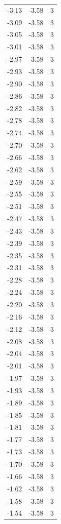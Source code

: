 \begin{longtable}{lrr}
  -3.13 & -3.58 & 3 \\
  -3.09 & -3.58 & 3 \\
  -3.05 & -3.58 & 3 \\
  -3.01 & -3.58 & 3 \\
  -2.97 & -3.58 & 3 \\
  -2.93 & -3.58 & 3 \\
  -2.90 & -3.58 & 3 \\
  -2.86 & -3.58 & 3 \\
  -2.82 & -3.58 & 3 \\
  -2.78 & -3.58 & 3 \\
  -2.74 & -3.58 & 3 \\
  -2.70 & -3.58 & 3 \\
  -2.66 & -3.58 & 3 \\
  -2.62 & -3.58 & 3 \\
  -2.59 & -3.58 & 3 \\
  -2.55 & -3.58 & 3 \\
  -2.51 & -3.58 & 3 \\
  -2.47 & -3.58 & 3 \\
  -2.43 & -3.58 & 3 \\
  -2.39 & -3.58 & 3 \\
  -2.35 & -3.58 & 3 \\
  -2.31 & -3.58 & 3 \\
  -2.28 & -3.58 & 3 \\
  -2.24 & -3.58 & 3 \\
  -2.20 & -3.58 & 3 \\
  -2.16 & -3.58 & 3 \\
  -2.12 & -3.58 & 3 \\
  -2.08 & -3.58 & 3 \\
  -2.04 & -3.58 & 3 \\
  -2.01 & -3.58 & 3 \\
  -1.97 & -3.58 & 3 \\
  -1.93 & -3.58 & 3 \\
  -1.89 & -3.58 & 3 \\
  -1.85 & -3.58 & 3 \\
  -1.81 & -3.58 & 3 \\
  -1.77 & -3.58 & 3 \\
  -1.73 & -3.58 & 3 \\
  -1.70 & -3.58 & 3 \\
  -1.66 & -3.58 & 3 \\
  -1.62 & -3.58 & 3 \\
  -1.58 & -3.58 & 3 \\
  -1.54 & -3.58 & 3 \\

\end{longtable}
